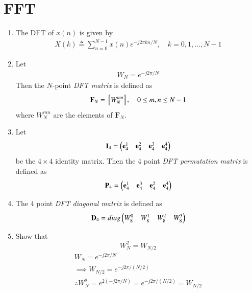 \documentclass[journal,12pt,twocolumn]{IEEEtran}
\let\vec\mathbf
\renewcommand\thesection{\arabic{section}}
\begin{document}
\section{FFT}
\begin{enumerate}[label=\arabic*.,ref=\thesection.\theenumi]
	\item The DFT of $x(n)$ is given by
\begin{align}
	X(k) \triangleq \sum_{n=0}^{N-1} x(n) e^{-j 2 \pi k n / N}, \quad k=0,1, \ldots, N-1
\end{align}
\item Let 
\begin{align}
	W_{N} = e^{-j2\pi/N} 
\end{align}
Then the $N$-point {\em DFT matrix} is defined as 
\begin{align}
	\vec{F}_{N} = \sbrak{W_{N}^{mn}}, \quad 0 \le m,n \le N-1 
\end{align}
where $W_{N}^{mn}$ are the elements of $\vec{F}_{N}$.
\item Let 
\begin{align}
	\vec{I}_4 = \myvec{\vec{e}_4^{1} &\vec{e}_4^{2} &\vec{e}_4^{3} &\vec{e}_4^{4} }
\end{align}
be the $4\times 4$ identity matrix.  Then the 4 point {\em DFT permutation matrix} is defined as 
\begin{align}
	\vec{P}_4 = \myvec{\vec{e}_4^{1} &\vec{e}_4^{3} &\vec{e}_4^{2} &\vec{e}_4^{4} }
\end{align}
\item The 4 point {\em DFT diagonal matrix} is defined as 
\begin{align}
	\vec{D}_4 = diag\myvec{W_{8}^{0} & W_{8}^{1} & W_{8}^{2} & W_{8}^{3}}
\end{align}
\item Show that 
\begin{equation}
	W_{N}^{2}=W_{N/2}
\end{equation}
\solution\begin{align}
	W_{N} = e^{-j2\pi/N}\\
	\implies W_{N/2} = e^{-j2\pi/(N/2)}\\
	\therefore W_{N}^{2} = e^{2 (-j2\pi/N)} = e^{-j2\pi/(N/2)} = W_{N/2}
\end{align}

\end{enumerate}
\end{document}
